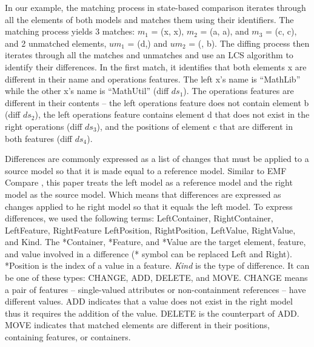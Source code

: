 \documentclass{jot}
\begin{document}
In our example, the matching process in state-based comparison iterates through all the elements of both models and matches them using their identifiers. The matching process yields 3 matches: $m_1$ = (\textsf{x}, \textsf{x}), $m_2$ = (\textsf{a}, \textsf{a}), and $m_3$ = (\textsf{c}, \textsf{c}), and 2 unmatched elements, $um_1$ = (\textsf{d},) and $um_2$ = (, \textsf{b}). The diffing process then iterates through all the matches and unmatches and use an LCS algorithm to identify their differences. In the first match, it identifies that both elements \textsf{x} are different in their \textsf{name} and \textsf{operations} features. 
The left \textsf{x}'s \textsf{name} is ``MathLib'' while the other \textsf{x}'s \textsf{name} is ``MathUtil'' (diff $ds_1$). The \textsf{operations} features are different in their contents -- the left \textsf{operations} feature does not contain element \textsf{b} (diff $ds_2$), the left \textsf{operations} feature contains element \textsf{d} 
that does not exist in the right \textsf{operations} (diff $ds_3$), and the positions of element \textsf{c} that are different in both features (diff $ds_4$).

Differences are commonly expressed as a list of changes that must be applied to a source model so that it is made equal to a reference model.
Similar to EMF Compare \cite{emfcompare2018developer}, this paper treats the left model as a reference model and the right model as the source model.
Which means that differences are expressed as changes applied to he right model so that it equals the left model.
To express differences, we used the following terms: \textsf{LeftContainer}, \textsf{RightContainer}, \textsf{LeftFeature}, \textsf{RightFeature} \textsf{LeftPosition}, \textsf{RightPosition}, \textsf{LeftValue}, \textsf{RightValue}, and \textsf{Kind}. The \textsf{*Container}, \textsf{*Feature}, and \textsf{*Value} are the target element, feature, and value involved in a difference (\textsf{*} symbol can be replaced \textsf{Left} and {Right}). \textsf{*Position} is the index of a value in a feature. \textit{Kind} is the type of difference. It can be one of these types: \textsf{CHANGE}, \textsf{ADD}, \textsf{DELETE}, and \textsf{MOVE}. \textsf{CHANGE} means a pair of features -- single-valued attributes or non-containment references -- have different values. \textsf{ADD} indicates that a value does not exist in the right model thus it requires the addition of the value. \textsf{DELETE} is the counterpart of \textsf{ADD}. \textsf{MOVE} indicates that matched elements are different in their positions, containing features, or containers. 
\end{document}
